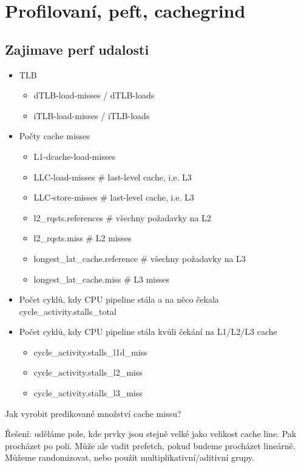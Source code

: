 \section{\texorpdfstring{Profilovaní, peft, cachegrind}{Profilovaní, peft, cachegrind}}
\vspace{5mm}
\large

\subsection{Zajimave perf udalosti}
\begin{itemize}
	\item TLB
		\begin{itemize}
			\item dTLB-load-misses / dTLB-loads
			\item iTLB-load-misses / iTLB-loads
		\end{itemize}
	\item Počty cache misses
		\begin{itemize}
			\item L1-dcache-load-misses
			\item LLC-load-misses \# last-level cache, i.e. L3
			\item LLC-store-misses \# last-level cache, i.e. L3
			\item l2\_rqsts.references \# všechny požadavky na L2
			\item l2\_rqsts.miss \# L2 misses
			\item longest\_lat\_cache.reference \# všechny požadavky na L3
			\item longest\_lat\_cache.miss \# L3 misses
		\end{itemize}
	\item Počet cyklů, kdy CPU pipeline stála a na něco čekala \\
	cycle\_activity.stalls\_total
	\item Počet cyklů, kdy CPU pipeline stála kvůli čekání na L1/L2/L3 cache
		\begin{itemize}
			\item cycle\_activity.stalls\_l1d\_miss
			\item cycle\_activity.stalls\_l2\_miss
			\item cycle\_activity.stalls\_l3\_miss
		\end{itemize}
\end{itemize}

\begin{exercise}
	Jak vyrobit predikované množství cache missu?

	Řešení: uděláme pole, kde prvky jsou stejně velké jako velikost cache line.
	Pak procházet po poli.
	Může ale vadit prefetch, pokud budeme procházet lineárně.
	Můžeme randomizovat, nebo použit multiplikativní/aditivní grupy.
\end{exercise}

